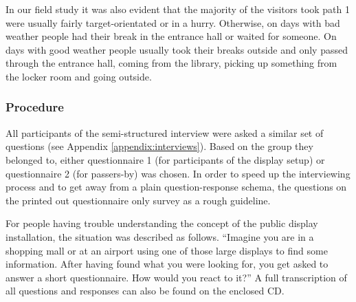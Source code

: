 	In our field study it was also evident that the majority of the visitors took path 1 were usually fairly target-orientated or in a hurry. Otherwise, on days with bad weather people had their break in the entrance hall or waited for someone. On days with good weather people usually took their breaks outside and only passed through the entrance hall, coming from the library, picking up something from the locker room and going outside.


	\subsubsection{Procedure}

		All participants of the semi-structured interview were asked a similar set of questions (see Appendix \ref{appendix:interviews}). Based on the group they belonged to, either questionnaire 1 (for participants of the display setup) or questionnaire 2 (for passers-by) was chosen. In order to speed up the interviewing process and to get away from a plain question-response schema, the questions on the printed out questionnaire only survey as a rough guideline. 

		For people having trouble understanding the concept of the public display installation, the situation was described as follows. ``Imagine you are in a shopping mall or at an airport using one of those large displays to find some information. After having found what you were looking for, you get asked to answer a short questionnaire. How would you react to it?'' A full transcription of all questions and responses can also be found on the enclosed CD. 



